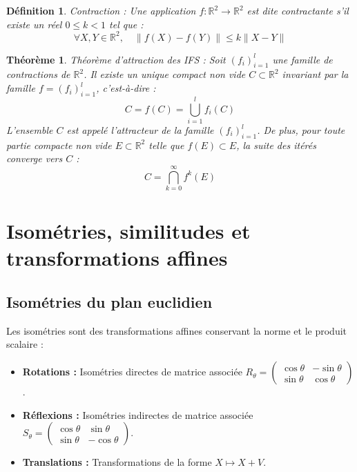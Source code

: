 \documentclass[11pt,a4paper]{article}
\newtheorem{definition}{Définition}[section]
\newtheorem{theorem}{Théorème}[section]
\begin{document}
\begin{definition} \textit{Contraction} :
Une application $f: \mathbb{R}^2 \to \mathbb{R}^2$ est dite contractante s'il existe un réel $0 \le k < 1$ tel que :
\begin{equation}
\forall X, Y \in \mathbb{R}^2, \quad \|f(X) - f(Y)\| \le k \|X - Y\|
\end{equation}
\end{definition}

\begin{theorem} \textit{Théorème d'attraction des IFS} :
Soit $(f_i)_{i=1}^l$ une famille de contractions de $\mathbb{R}^2$. Il existe un unique compact non vide $C \subset \mathbb{R}^2$ invariant par la famille $f = (f_i)_{i=1}^l$, c'est-à-dire :
\begin{equation}
C = f(C) = \bigcup_{i=1}^{l} f_i(C)
\end{equation}
L'ensemble $C$ est appelé l'attracteur de la famille $(f_i)_{i=1}^l$. De plus, pour toute partie compacte non vide $E \subset \mathbb{R}^2$ telle que $f(E) \subset E$, la suite des itérés converge vers $C$ :
\begin{equation}
C = \bigcap_{k=0}^{\infty} f^k(E)
\end{equation}
\end{theorem}

\section{Isométries, similitudes et transformations affines}

\subsection{Isométries du plan euclidien}
Les isométries sont des transformations affines conservant la norme et le produit scalaire :
\begin{itemize}
    \item \textbf{Rotations :} Isométries directes de matrice associée $R_\theta = \begin{pmatrix} \cos\theta & -\sin\theta \\ \sin\theta & \cos\theta \end{pmatrix}$.
    \item \textbf{Réflexions :} Isométries indirectes de matrice associée $S_\theta = \begin{pmatrix} \cos\theta & \sin\theta \\ \sin\theta & -\cos\theta \end{pmatrix}$.
    \item \textbf{Translations :} Transformations de la forme $X \mapsto X + V$.
\end{itemize}
\end{document}
